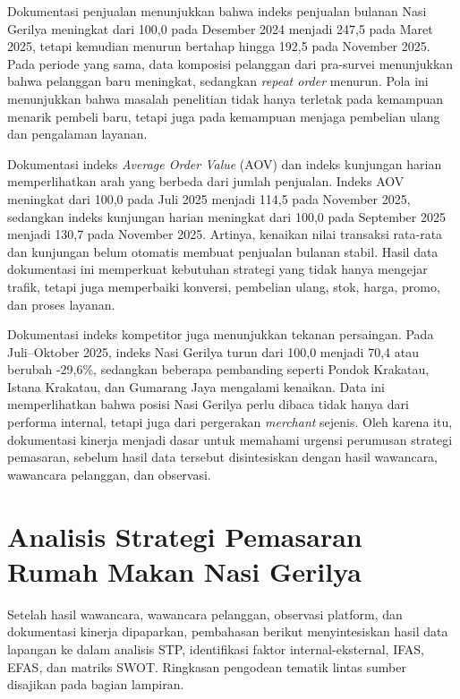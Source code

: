 Dokumentasi penjualan menunjukkan bahwa indeks penjualan bulanan Nasi Gerilya meningkat dari 100,0 pada Desember 2024 menjadi 247,5 pada Maret 2025, tetapi kemudian menurun bertahap hingga 192,5 pada November 2025. Pada periode yang sama, data komposisi pelanggan dari pra-survei menunjukkan bahwa pelanggan baru meningkat, sedangkan \textit{repeat order} menurun. Pola ini menunjukkan bahwa masalah penelitian tidak hanya terletak pada kemampuan menarik pembeli baru, tetapi juga pada kemampuan menjaga pembelian ulang dan pengalaman layanan.

Dokumentasi indeks \textit{Average Order Value} (AOV) dan indeks kunjungan harian memperlihatkan arah yang berbeda dari jumlah penjualan. Indeks AOV meningkat dari 100,0 pada Juli 2025 menjadi 114,5 pada November 2025, sedangkan indeks kunjungan harian meningkat dari 100,0 pada September 2025 menjadi 130,7 pada November 2025. Artinya, kenaikan nilai transaksi rata-rata dan kunjungan belum otomatis membuat penjualan bulanan stabil. Hasil data dokumentasi ini memperkuat kebutuhan strategi yang tidak hanya mengejar trafik, tetapi juga memperbaiki konversi, pembelian ulang, stok, harga, promo, dan proses layanan.

Dokumentasi indeks kompetitor juga menunjukkan tekanan persaingan. Pada Juli--Oktober 2025, indeks Nasi Gerilya turun dari 100,0 menjadi 70,4 atau berubah -29,6\%, sedangkan beberapa pembanding seperti Pondok Krakatau, Istana Krakatau, dan Gumarang Jaya mengalami kenaikan. Data ini memperlihatkan bahwa posisi Nasi Gerilya perlu dibaca tidak hanya dari performa internal, tetapi juga dari pergerakan \textit{merchant} sejenis. Oleh karena itu, dokumentasi kinerja menjadi dasar untuk memahami urgensi perumusan strategi pemasaran, sebelum hasil data tersebut disintesiskan dengan hasil wawancara, wawancara pelanggan, dan observasi.

\section{Analisis Strategi Pemasaran Rumah Makan Nasi Gerilya}

Setelah hasil wawancara, wawancara pelanggan, observasi platform, dan dokumentasi kinerja dipaparkan, pembahasan berikut menyintesiskan hasil data lapangan ke dalam analisis STP, identifikasi faktor internal-eksternal, IFAS, EFAS, dan matriks SWOT. Ringkasan pengodean tematik lintas sumber disajikan pada bagian lampiran.

